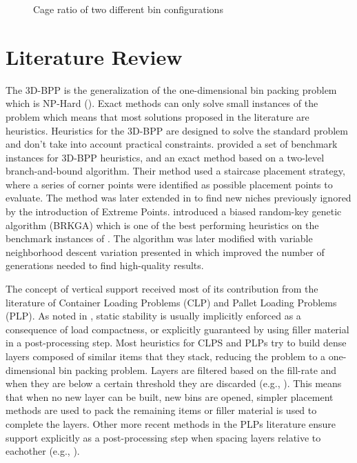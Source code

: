 \documentclass[11pt,a4paper,twocolumn]{article}
\begin{document}
\begin{figure}[h]
    \resizebox{\columnwidth}{!}{%
    
    }
    \caption{Cage ratio of two different bin configurations}
    \label{fig:cage_ratio}
\end{figure}

\section{Literature Review}
The 3D-BPP is the generalization of the one-dimensional bin packing problem which is NP-Hard (\cite{martello2000three}).
Exact methods can only solve small instances of the problem which means that most solutions proposed in the literature are heuristics.
Heuristics for the 3D-BPP are designed to solve the standard problem and don't take into account practical constraints.
\cite{martello2000three} provided a set of benchmark instances for 3D-BPP heuristics, and an exact method based on a two-level branch-and-bound algorithm.
Their method used a staircase placement strategy, where a series of corner points were identified as possible placement points to evaluate.
The method was later extended in \cite{crainic2008extreme} to find new niches previously ignored by the introduction of Extreme Points.
\cite{gonccalves2013biased} introduced a biased random-key genetic algorithm (BRKGA) which is one of the best performing heuristics on the benchmark instances of \cite{martello2000three}.
The algorithm was later modified with variable neighborhood descent variation presented in \cite{zudio2018brkga} which improved the number of generations needed to find high-quality results.

The concept of vertical support received most of its contribution from the literature of Container Loading Problems (CLP) and Pallet Loading Problems (PLP).
As noted in \cite{BORTFELDT20131}, static stability is usually implicitly enforced as a consequence of load compactness, or explicitly guaranteed by using filler material in a post-processing step.
Most heuristics for CLPS and PLPs try to build dense layers composed of similar items that they stack, reducing the problem to a one-dimensional bin packing problem.
Layers are filtered based on the fill-rate and when they are below a certain threshold they are discarded (e.g., \cite{elhedhli2019three, Alonso2020}).
This means that when no new layer can be built, new bins are opened, simpler placement methods are used to pack the remaining items or filler material is used to complete the layers.
Other more recent methods in the PLPs literature ensure support explicitly as a post-processing step when spacing layers relative to eachother (e.g., \cite{GZARA20201062}).
\end{document}
